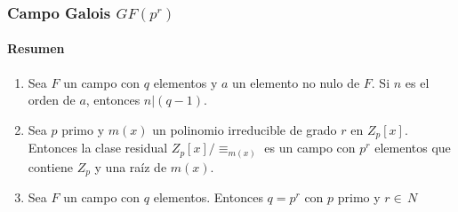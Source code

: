 \documentclass{beamer}
\begin{document}
\begin{frame}
	\frametitle{Campo Galois $GF(p^r)$}
	\framesubtitle{Resumen}
	\begin{enumerate}[<+->] %
		\item Sea $F$ un campo con $q$ elementos y $a$ un elemento no
		nulo de $F$. Si $n$ es el orden de $a$, entonces $n|(q-1)$.
		\item Sea $p$ primo y $m(x)$ un polinomio irreducible de grado
		$r$ en $Z_p[x]$.
		Entonces la clase residual $Z_p[x]/\equiv_{m(x)}$ es un campo
		con $p^r$ elementos que contiene $Z_p$ y una raíz de $m(x)$.
		\item Sea $F$ un campo con $q$ elementos.
		Entonces $q=p^r$ con $p$ primo y $r \in \, N$
	\end{enumerate}
\end{frame}
\end{document}
